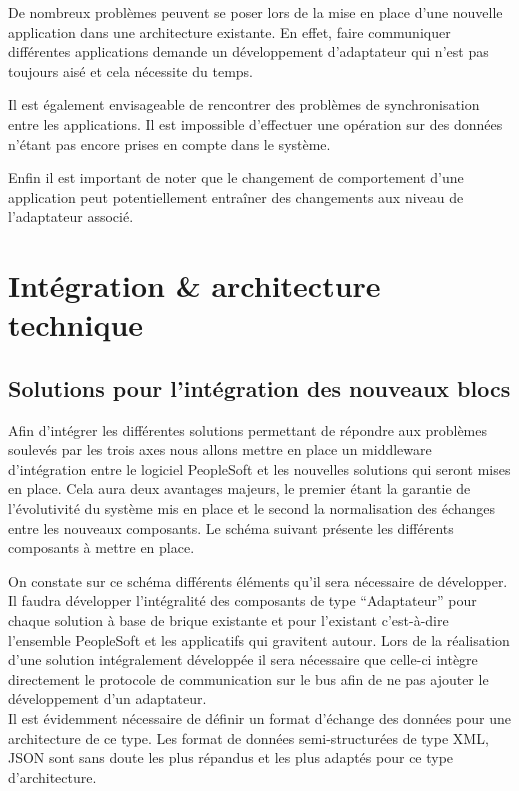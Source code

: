 De nombreux problèmes peuvent se poser lors de la mise en place d’une nouvelle application dans une architecture existante. En effet, faire communiquer différentes applications demande un développement d’adaptateur qui n’est pas toujours aisé et cela nécessite du temps. 

Il est également envisageable de rencontrer des problèmes de synchronisation entre les applications. Il est impossible d’effectuer une opération sur des données n’étant pas encore prises en compte dans le système.

Enfin il est important de noter que le changement de comportement d’une application peut potentiellement entraîner des changements aux niveau de l’adaptateur associé.

\section{Intégration \& architecture technique}

\subsection{Solutions pour l’intégration des nouveaux blocs}

Afin d’intégrer les différentes solutions permettant de répondre aux problèmes soulevés par les trois axes nous allons mettre en place un middleware d’intégration entre le logiciel PeopleSoft et les nouvelles solutions qui seront mises en place. Cela aura deux avantages majeurs, le premier étant la garantie de l’évolutivité du système mis en place et le second la normalisation des échanges entre les nouveaux composants. Le schéma suivant présente les différents composants à mettre en place.


On constate sur ce schéma différents éléments qu’il sera nécessaire de développer. Il faudra développer l’intégralité des composants de type “Adaptateur” pour chaque solution à base de brique existante et pour l’existant c’est-à-dire l’ensemble PeopleSoft et les applicatifs qui gravitent autour. Lors de la réalisation d’une solution intégralement développée il sera nécessaire que celle-ci intègre directement le protocole de communication sur le bus afin de ne pas ajouter le développement d’un adaptateur. \\
    
Il est évidemment nécessaire de définir un format d’échange des données pour une architecture de ce type. Les format de données semi-structurées de type XML, JSON sont sans doute les plus répandus et les plus adaptés pour ce type d’architecture. \\

